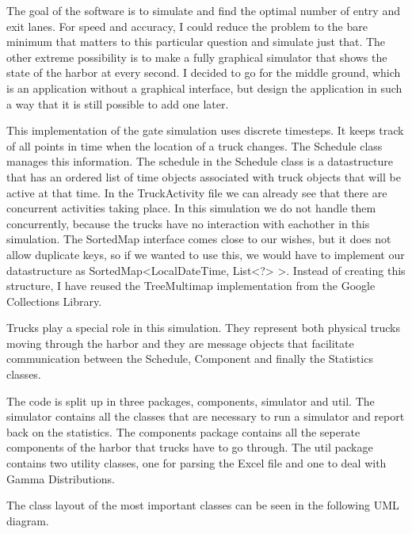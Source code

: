 \documentclass{article}
\begin{document}
The goal of the software is to simulate and find the optimal number of
entry and exit lanes. For speed and accuracy, I could reduce the
problem to the bare minimum that matters to this particular question
and simulate just that. The other extreme possibility is to make a
fully graphical simulator that shows the state of the harbor at every
second. I decided to go for the middle ground, which is an application
without a graphical interface, but design the application in such a
way that it is still possible to add one later.

This implementation of the gate simulation uses discrete timesteps. It
keeps track of all points in time when the location of a truck
changes. The Schedule class manages this information. The schedule in
the Schedule class is a datastructure that has an ordered list of time
objects associated with truck objects that will be active at that
time. In the TruckActivity file we can already see that there are
concurrent activities taking place. In this simulation we do not
handle them concurrently, because the trucks have no interaction with
eachother in this simulation. The SortedMap interface comes close to
our wishes, but it does not allow duplicate keys, so if we wanted to
use this, we would have to implement our datastructure as
SortedMap\textless LocalDateTime, List\textless ?\textgreater
\textgreater. Instead of creating this structure, I have reused the
TreeMultimap implementation from the Google Collections Library.

Trucks play a special role in this simulation. They represent both
physical trucks moving through the harbor and they are message objects
that facilitate communication between the Schedule, Component and
finally the Statistics classes.

The code is split up in three packages, components, simulator and
util. The simulator contains all the classes that are necessary to run
a simulator and report back on the statistics. The components package
contains all the seperate components of the harbor that trucks have to
go through. The util package contains two utility classes, one for
parsing the Excel file and one to deal with Gamma Distributions.

The class layout of the most important classes can be seen in the
following UML diagram.
\end{document}
